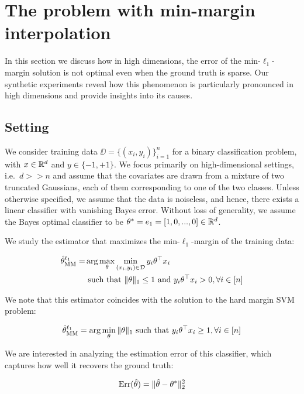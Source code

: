 \section{The problem with min-margin interpolation}

In this section we discuss how in high dimensions, the error of the
min-$\ell_1$-margin solution is not optimal even when the ground truth is
sparse. Our synthetic experiments reveal how this phenomenon is particularly
pronounced in high dimensions and provide insights into its causes.

\subsection{Setting}

We consider training data $\DD=\{(x_i, y_i)\}_{i=1}^{n}$ for a binary
classification problem, with $x\in \mathbb{R}^d$ and $y\in \{-1, +1\}$. We focus
primarily on high-dimensional settings, i.e.\ $d >> n$ and assume that the
covariates are drawn from a mixture of two truncated Gaussians, each of them
corresponding to one of the two classes. Unless otherwise specified, we assume
that the data is noiseless, and hence, there exists a linear classifier with
vanishing Bayes error. Without loss of generality, we assume the Bayes optimal
classifier to be $\theta^*=e_1=[1, 0, ..., 0] \in \mathbb{R}^d$.

We study the estimator that maximizes the min-$\ell_1$-margin of the training
data:

\begin{align}
  \hat{\theta}^{\ell_1}_{\mathrm{MM}} =& \arg\max_{\theta} \min_{(x_i, y_i) \in \mathcal{D}} y_i\theta^\top x_i \\
  &\text{ such that }
  \|\theta\|_1 \le 1 \text{ and } y_i\theta^\top x_i > 0, \forall i \in [n]
\end{align}

We note that this estimator coincides with the solution to the hard margin SVM
problem:

\begin{align}
  \hat{\theta}^{\ell_1}_{\mathrm{MM}} = \arg\min_{\theta} \|\theta\|_1 \text{ such that } y_i\theta^\top x_i \ge 1, \forall i \in
  [n]
\end{align}


We are interested in analyzing the estimation error of this classifier,
which captures how well it recovers the ground truth:

\begin{align}
\text{Err}(\hat{\theta}) = \|\hat{\theta} - \theta^*\|_2^2 
\end{align}

